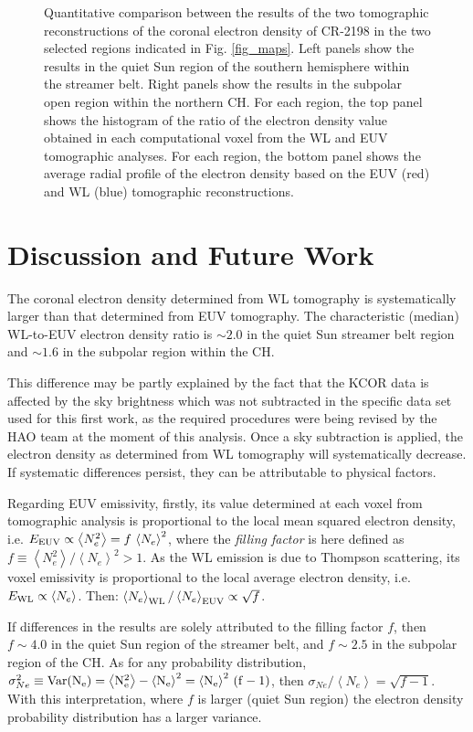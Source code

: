 \documentclass[baaa]{baaa}
\begin{document}
\begin{figure}[!ht]
  \caption{Quantitative comparison between the results of the two tomographic reconstructions of the coronal electron density of CR-2198 in the two selected regions indicated in Fig. \ref{fig_maps}. Left panels show the results in the quiet {Sun} region of the southern hemisphere within the streamer belt. Right panels show the results in the subpolar open region within the northern CH. For each region, the top panel shows the histogram of the ratio of the electron density value obtained in each computational voxel from the WL and EUV tomographic {analyses}. For each region, the bottom panel shows the average radial profile of the electron density based on the EUV (red) and WL (blue) tomographic reconstructions.}
  \label{fig_analysis}
\end{figure}

\section{Discussion and Future Work}

The coronal electron density determined from WL tomography is systematically larger than that determined from EUV tomography. The characteristic (median) WL-to-EUV electron density ratio is $\sim 2.0$ in the quiet {Sun} streamer belt region and $\sim 1.6$ in the subpolar region within the CH.

This difference may be partly explained by the fact that the KCOR data is affected by the sky brightness which was not subtracted in the specific data set used for this first work, as the required procedures were being revised by the HAO team at the moment of this analysis. Once a sky subtraction is applied, the electron density as determined from WL tomography will systematically decrease. If systematic differences persist, they can be attributable to physical factors. 

{Regarding EUV emissivity, firstly, its value determined} at each voxel from tomographic analysis is proportional to the local mean squared electron density, i.e. $E_{\rm{EUV}} \propto \left<N_e^2\right> = f\,\left<N_e\right>^2$, where the \emph{filling factor} is here defined as $f\equiv\left<N_e^2\right> / \left<N_e\right>^2 > 1$. As the WL emission is due to Thompson scattering, its voxel emissivity is proportional to the local average electron density, i.e. $E_{\rm{WL}} \propto \left<N_e\right>$. Then: $\left<N_e\right>_{\rm{WL}} / \left<N_e\right>_{\rm{EUV}} \propto \sqrt{f}$. 

If differences in the results are solely attributed to the filling factor $f$, then $f\sim 4.0$ in the quiet Sun region of the streamer belt, and $f\sim 2.5$ in the subpolar region of the CH. As for any probability distribution, $\sigma_{Ne}^2 \equiv \rm{Var}(N_e) = \left<N_e^2\right> - \left<N_e\right>^2 = \left<N_e\right>^2 \, (f-1)$, then $\sigma_{Ne} / \left<N_e\right> = \sqrt{f-1}$. With this interpretation, where $f$ is larger (quiet {Sun} region) the electron density probability distribution has a larger variance.
\end{document}
